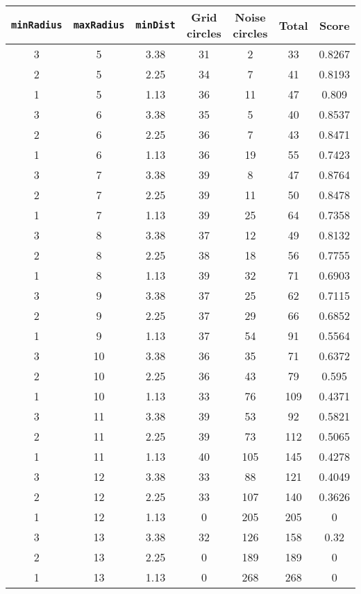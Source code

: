 \documentclass[letterpaper, 12pt]{article}
\begin{document}
\begin{longtable}{|c|c|c|c|c|c|c|}
\hline
\textbf{\texttt{minRadius}} & \textbf{\texttt{maxRadius}} & \textbf{\texttt{minDist}} & \textbf{Grid circles} & \textbf{Noise circles} & \textbf{Total} & \textbf{Score} \\
\hline
3 & 5 & 3.38 & 31 & 2 & 33 & 0.8267 \\
\hline
2 & 5 & 2.25 & 34 & 7 & 41 & 0.8193 \\
\hline
1 & 5 & 1.13 & 36 & 11 & 47 & 0.809 \\
\hline
3 & 6 & 3.38 & 35 & 5 & 40 & 0.8537 \\
\hline
2 & 6 & 2.25 & 36 & 7 & 43 & 0.8471 \\
\hline
1 & 6 & 1.13 & 36 & 19 & 55 & 0.7423 \\
\hline
3 & 7 & 3.38 & 39 & 8 & 47 & 0.8764 \\
\hline
2 & 7 & 2.25 & 39 & 11 & 50 & 0.8478 \\
\hline
1 & 7 & 1.13 & 39 & 25 & 64 & 0.7358 \\
\hline
3 & 8 & 3.38 & 37 & 12 & 49 & 0.8132 \\
\hline
2 & 8 & 2.25 & 38 & 18 & 56 & 0.7755 \\
\hline
1 & 8 & 1.13 & 39 & 32 & 71 & 0.6903 \\
\hline
3 & 9 & 3.38 & 37 & 25 & 62 & 0.7115 \\
\hline
2 & 9 & 2.25 & 37 & 29 & 66 & 0.6852 \\
\hline
1 & 9 & 1.13 & 37 & 54 & 91 & 0.5564 \\
\hline
3 & 10 & 3.38 & 36 & 35 & 71 & 0.6372 \\
\hline
2 & 10 & 2.25 & 36 & 43 & 79 & 0.595 \\
\hline
1 & 10 & 1.13 & 33 & 76 & 109 & 0.4371 \\
\hline
3 & 11 & 3.38 & 39 & 53 & 92 & 0.5821 \\
\hline
2 & 11 & 2.25 & 39 & 73 & 112 & 0.5065 \\
\hline
1 & 11 & 1.13 & 40 & 105 & 145 & 0.4278 \\
\hline
3 & 12 & 3.38 & 33 & 88 & 121 & 0.4049 \\
\hline
2 & 12 & 2.25 & 33 & 107 & 140 & 0.3626 \\
\hline
1 & 12 & 1.13 & 0 & 205 & 205 & 0 \\
\hline
3 & 13 & 3.38 & 32 & 126 & 158 & 0.32 \\
\hline
2 & 13 & 2.25 & 0 & 189 & 189 & 0 \\
\hline
1 & 13 & 1.13 & 0 & 268 & 268 & 0 \\

\end{longtable}
\end{document}
